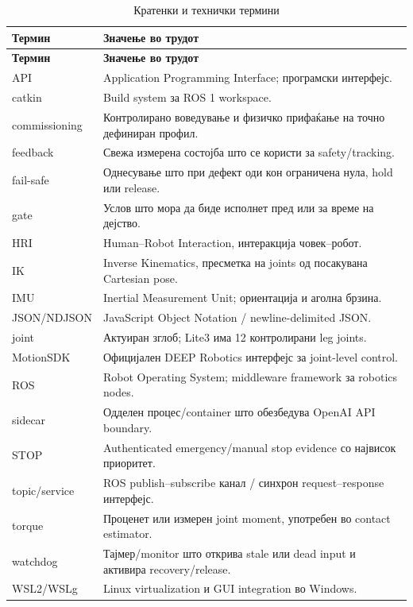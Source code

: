 \begin{longtable}{L{0.18\textwidth}L{0.74\textwidth}}
\caption{Кратенки и технички термини}\label{tab:glossary}\\
\toprule
\textbf{Термин} & \textbf{Значење во трудот} \\
\midrule
\endfirsthead
\toprule
\textbf{Термин} & \textbf{Значење во трудот} \\
\midrule
\endhead
\bottomrule
\endfoot
API & Application Programming Interface; програмски интерфејс. \\
catkin & Build system за ROS 1 workspace. \\
commissioning & Контролирано воведување и физичко прифаќање на точно дефиниран профил. \\
feedback & Свежа измерена состојба што се користи за safety/tracking. \\
fail-safe & Однесување што при дефект оди кон ограничена нула, hold или release. \\
gate & Услов што мора да биде исполнет пред или за време на дејство. \\
HRI & Human--Robot Interaction, интеракција човек--робот. \\
IK & Inverse Kinematics, пресметка на joints од посакувана Cartesian pose. \\
IMU & Inertial Measurement Unit; ориентација и аголна брзина. \\
JSON/NDJSON & JavaScript Object Notation / newline-delimited JSON. \\
joint & Актуиран зглоб; Lite3 има 12 контролирани leg joints. \\
MotionSDK & Официјален DEEP Robotics интерфејс за joint-level control. \\
ROS & Robot Operating System; middleware framework за robotics nodes. \\
sidecar & Одделен процес/container што обезбедува OpenAI API boundary. \\
STOP & Authenticated emergency/manual stop evidence со највисок приоритет. \\
topic/service & ROS publish--subscribe канал / синхрон request--response интерфејс. \\
torque & Проценет или измерен joint moment, употребен во contact estimator. \\
watchdog & Тајмер/monitor што открива stale или dead input и активира recovery/release. \\
WSL2/WSLg & Linux virtualization и GUI integration во Windows. \\
\end{longtable}
